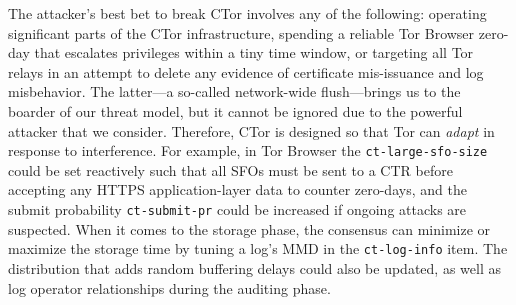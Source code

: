 The attacker's best bet to break CTor involves any of the following:
	operating significant parts of the CTor infrastructure,
	spending a reliable Tor Browser zero-day that escalates privileges within a
		tiny time window, or
	targeting all Tor relays in an attempt to delete any evidence of certificate
		mis-issuance and log misbehavior.
The latter---a so-called network-wide flush---brings us to the boarder of our
threat model, but it cannot be ignored due to the powerful attacker that we
consider.  Therefore, CTor is designed so that Tor can \emph{adapt} in response
to interference.  For example, in Tor Browser the \texttt{ct-large-sfo-size}
could be set reactively such that all SFOs must be sent to a CTR before
accepting any HTTPS application-layer data to counter zero-days, and the submit
probability \texttt{ct-submit-pr} could be increased if ongoing attacks are
suspected.  When it comes to the storage phase, the consensus can minimize or
maximize the storage time by tuning a log's MMD in the \texttt{ct-log-info}
item.  The distribution that adds random buffering delays could also be updated,
as well as log operator relationships during the auditing phase.
